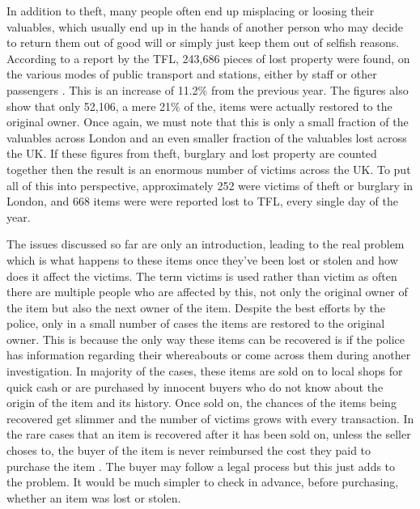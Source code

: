 In addition to theft, many people often end up misplacing or loosing their valuables, which usually end up in the hands of another person who may decide to return them out of good will or simply just keep them out of selfish reasons. According to a report by the TFL, 243,686 pieces of lost property were found, on the various modes of public transport and stations, either by staff or other passengers \cite{TFL:LostProperty}. This is an increase of 11.2\% from the previous year. The figures also show that only 52,106, a mere 21\% of the, items were actually restored to the original owner. Once again, we must note that this is only a small fraction of the valuables across London and an even smaller fraction of the valuables lost across the UK. If these figures from theft, burglary and lost property are counted together then the result is an enormous number of victims across the UK. To put all of this into perspective, approximately 252 were victims of theft or burglary in London, and 668 items were were reported lost to TFL, every single day of the year.

The issues discussed so far are only an introduction, leading to the real problem which is what happens to these items once they've been lost or stolen and how does it affect the victims. The term victims is used rather than victim as often there are multiple people who are affected by this, not only the original owner of the item but also the next owner of the item. Despite the best efforts by the police, only in a small number of cases the items are restored to the original owner. This is because the only way these items can be recovered is if the police has information regarding their whereabouts or come across them during another investigation. In majority of the cases, these items are sold on to local shops for quick cash or are purchased by innocent buyers who do not know about the origin of the item and its history. Once sold on, the chances of the items being recovered get slimmer and the number of victims grows with every transaction. In the rare cases that an item is recovered after it has been sold on, unless the seller choses to, the buyer of the item is never reimbursed the cost they paid to purchase the item \cite{CitizenAdvice:StolenGoods}. The buyer may follow a legal process but this just adds to the problem. It would be much simpler to check in advance, before purchasing, whether an item was lost or stolen.

